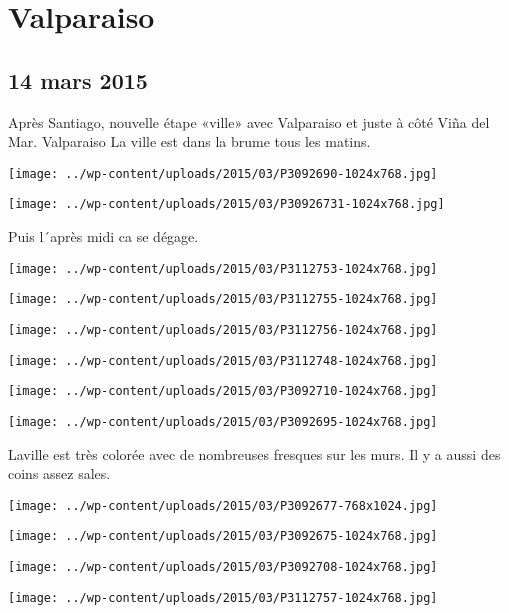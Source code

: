 \chapter{Valparaiso}
\section*{14 mars 2015}
Après Santiago, nouvelle étape «ville» avec Valparaiso et juste à côté Viña del Mar. \newline
 Valparaiso \newline
 La ville est dans la brume tous les matins. \newline
 \newline
\centerline{\texttt{[image: ../wp-content/uploads/2015/03/P3092690-1024x768.jpg]} } 
\newline
\centerline{\texttt{[image: ../wp-content/uploads/2015/03/P30926731-1024x768.jpg]} } 
Puis l´après midi ca se dégage. \newline
 \newline
\centerline{\texttt{[image: ../wp-content/uploads/2015/03/P3112753-1024x768.jpg]} } 
 \newline
\centerline{\texttt{[image: ../wp-content/uploads/2015/03/P3112755-1024x768.jpg]} } 
 \newline
\centerline{\texttt{[image: ../wp-content/uploads/2015/03/P3112756-1024x768.jpg]} } 
\newline
\centerline{\texttt{[image: ../wp-content/uploads/2015/03/P3112748-1024x768.jpg]} } 
 \newline
\centerline{\texttt{[image: ../wp-content/uploads/2015/03/P3092710-1024x768.jpg]} } 
 \newline
\centerline{\texttt{[image: ../wp-content/uploads/2015/03/P3092695-1024x768.jpg]} } 
Laville est très colorée avec de nombreuses fresques sur les murs. Il y a aussi des coins assez sales. \newline
 \newline
\centerline{\texttt{[image: ../wp-content/uploads/2015/03/P3092677-768x1024.jpg]} } 
 \newline
\centerline{\texttt{[image: ../wp-content/uploads/2015/03/P3092675-1024x768.jpg]} } 
 \newline
\centerline{\texttt{[image: ../wp-content/uploads/2015/03/P3092708-1024x768.jpg]} } 
 \newline
\centerline{\texttt{[image: ../wp-content/uploads/2015/03/P3112757-1024x768.jpg]} } 
